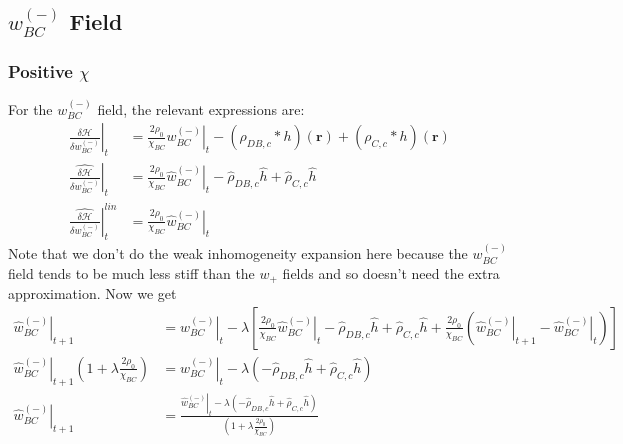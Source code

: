 \documentclass{article}
\begin{document}
  

    \subsection{$w_{BC}^{(-)}$ Field}
    \subsubsection{Positive $\chi$}
  For the $w_{BC}^{(-)}$ field, the relevant expressions are:
  \begin{align*}
  \left. \frac{\delta \mathcal{H}}{\delta w_{BC}^{(-)}} \right|_t &=
  \frac{2 \rho_0}{\chi_{BC}} \left. w_{BC}^{(-)} \right|_t
  - (\rho_{DB,c} \ast h)(\mathbf{r})
  + (\rho_{C,c} \ast h)(\mathbf{r}) \\
  \left. \hat{\frac{\delta \mathcal{H}}{\delta w_{BC}^{(-)}}} \right|_t &=
  \frac{2 \rho_0}{\chi_{BC}} \left. \hat{w}_{BC}^{(-)} \right|_t
  - \hat{\rho}_{DB,c} \hat{h}
  + \hat{\rho}_{C,c} \hat{h} \\
  \left.
  \hat{\frac{\delta \mathcal{H}}{\delta w_{BC}^{(-)}}}
  \right| ^{lin}_t &=
  \frac{2\rho_0}{\chi_{BC}} \left. \hat{w}_{BC}^{(-)} \right|_t
  \end{align*}
  Note that we don't do the weak inhomogeneity expansion here because the
  $w_{BC}^{(-)}$ field tends to be much less stiff than the $w_+$ fields and so
  doesn't need the extra approximation.
  Now we get
  \begin{align*}
  \left. \hat{w}_{BC}^{(-)} \right|_{t+1} &=
  \left. \hat{w}_{BC}^{(-)} \right|_t - \lambda \left[
  \frac{2\rho_0}{\chi_{BC}} \left. \hat{w}_{BC}^{(-)} \right|_t
  - \hat{\rho}_{DB,c} \hat{h}
  + \hat{\rho}_{C,c} \hat{h}
  + \frac{2\rho_0}{\chi_{BC}}
  ( \left. \hat{w}_{BC}^{(-)}\right|_{t+1}
  - \left. \hat{w}_{BC}^{(-)} \right|_t
  )
  \right] \\
  \left. \hat{w}_{BC}^{(-)} \right|_{t+1} ( 1 + \lambda \frac{2
  	\rho_0}{\chi_{BC}} ) &=
  \left. \hat{w}_{BC}^{(-)} \right|_t - \lambda \left(
  - \hat{\rho}_{DB,c} \hat{h}
  + \hat{\rho}_{C,c} \hat{h}
  \right) \\
  \left. \hat{w}_{BC}^{(-)} \right|_{t+1} &=
  \frac{
  	\left. \hat{w}_{BC}^{(-)} \right|_t - \lambda \left(
  	- \hat{\rho}_{DB,c} \hat{h}
  	+ \hat{\rho}_{C,c} \hat{h}
  	\right)
  }
  {
  	\left( 1 + \lambda \frac{2 \rho_0}{\chi_{BC}} \right)
  }
  \end{align*}
  
\end{document}
